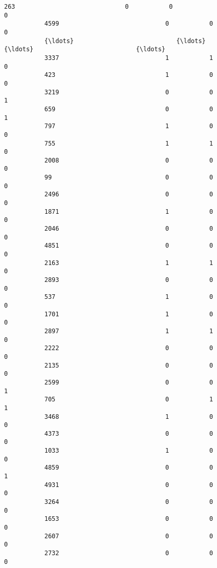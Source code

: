 \documentclass[11pt]{article}
\begin{document}
\begin{Verbatim}[commandchars=\\\{\}]
           263                              0           0                              0   
           4599                             0           0                              0   
           {\ldots}                            {\ldots}         {\ldots}                            {\ldots}   
           3337                             1           1                              0   
           423                              1           0                              0   
           3219                             0           0                              1   
           659                              0           0                              1   
           797                              1           0                              0   
           755                              1           1                              0   
           2008                             0           0                              0   
           99                               0           0                              0   
           2496                             0           0                              0   
           1871                             1           0                              0   
           2046                             0           0                              0   
           4851                             0           0                              0   
           2163                             1           1                              0   
           2893                             0           0                              0   
           537                              1           0                              0   
           1701                             1           0                              0   
           2897                             1           1                              0   
           2222                             0           0                              0   
           2135                             0           0                              0   
           2599                             0           0                              1   
           705                              0           1                              1   
           3468                             1           0                              0   
           4373                             0           0                              0   
           1033                             1           0                              0   
           4859                             0           0                              1   
           4931                             0           0                              0   
           3264                             0           0                              0   
           1653                             0           0                              0   
           2607                             0           0                              0   
           2732                             0           0                              0   
           

\end{Verbatim}
\end{document}
